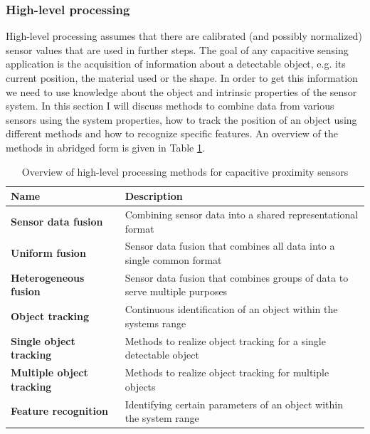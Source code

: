 \subsubsection{High-level processing}
High-level processing assumes that there are calibrated (and possibly normalized) sensor values that are used in further steps. The goal of any capacitive sensing application is the acquisition of information about a detectable object, e.g. its current position, the material used or the shape. In order to get this information we need to use knowledge about the object and intrinsic properties of the sensor system. In this section I will discuss methods to combine data from various sensors using the system properties, how to track the position of an object using different methods and how to recognize specific features. An overview of the methods in abridged form is given in Table \ref{tab:rel_highlevel}. 
\begin{table}[htbp]
  \centering
  \caption{Overview of high-level processing methods for capacitive proximity sensors}
    \begin{tabular}{lp{5cm}}
    \toprule
    \textbf{Name} & \textbf{Description} \\
    \midrule
    \textbf{Sensor data fusion} & Combining sensor data into a shared representational format \\ \addlinespace
    \textbf{Uniform fusion} & Sensor data fusion that combines all data into a single common format \\ \addlinespace
    \textbf{Heterogeneous fusion} & Sensor data fusion that combines groups of data to serve multiple purposes \\ \addlinespace
    \textbf{Object tracking } & Continuous identification of an object within the systems range \\ \addlinespace
    \textbf{Single object tracking} & Methods to realize object tracking for a single detectable object \\ \addlinespace
    \textbf{Multiple object tracking} & Methods to realize object tracking for multiple objects \\ \addlinespace
    \textbf{Feature recognition} & Identifying certain parameters of an object within the system range \\
    \bottomrule
    \end{tabular}%
  \label{tab:rel_highlevel}
\end{table}%

